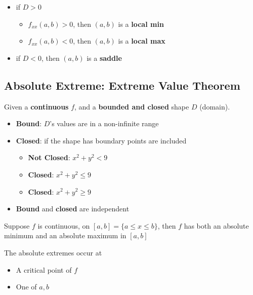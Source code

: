     \begin{itemize}
      \item if $ D > 0 $
      \begin{itemize}
        \item $ f_{xx} (a, b) > 0 $, then $ (a, b) $ is a \textbf{local min}
        \item $ f_{xx} (a, b) < 0 $, then $ (a, b) $ is a \textbf{local max}
      \end{itemize}

      \item if $ D < 0 $, then $ (a, b) $ is a \textbf{saddle}
    \end{itemize}

  \subsection{Absolute Extreme: Extreme Value Theorem}

    Given a \textbf{continuous} $ f $, and a \textbf{bounded and closed}
    shape $ D $ (domain).

    \begin{itemize}
      \item \textbf{Bound}: $ D $'s values are in a non-infinite range
      \item \textbf{Closed}: if the shape has boundary points are included
      \begin{itemize}
        \item \textbf{Not Closed}: $ x^{2} + y^{2} < 9 $
        \item \textbf{Closed}: $ x^{2} + y^{2} \le 9 $
        \item \textbf{Closed}: $ x^{2} + y^{2} \ge 9 $
      \end{itemize}

      \item \textbf{Bound} and \textbf{closed} are independent
    \end{itemize}

    Suppose $ f $ is continuous, on $ \left[ a, b \right] = \{ a \le x \le b \} $,
    then $ f $ has both an absolute minimum and an absolute maximum in
    $ \left[ a, b \right] $

    The absolute extremes occur at
    \begin{itemize}
      \item A critical point of $ f $
      \item One of $ a, b $
    \end{itemize}

